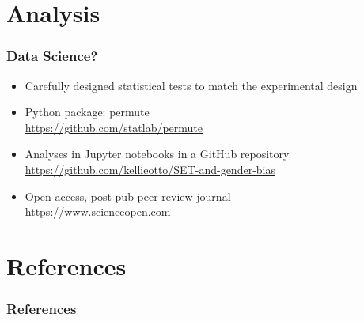 \documentclass{beamer}
\begin{document}
\section{Analysis}
\frame
{
 \frametitle{Data Science?}
\Large
 \begin{itemize}
 \itemsep 10pt
 \item Carefully designed statistical tests to match the experimental design
 \item{Python package: permute \\
 \url{https://github.com/statlab/permute}
 }
 \item{Analyses in Jupyter notebooks in a GitHub repository \\
 \url{https://github.com/kellieotto/SET-and-gender-bias}
 }
 \item{Open access, post-pub peer review journal \\
 \url{https://www.scienceopen.com}
 }
 \end{itemize}

}

\section{References}


\begin{frame}
\frametitle{References}


\itemize
\end{frame}
\end{document}
